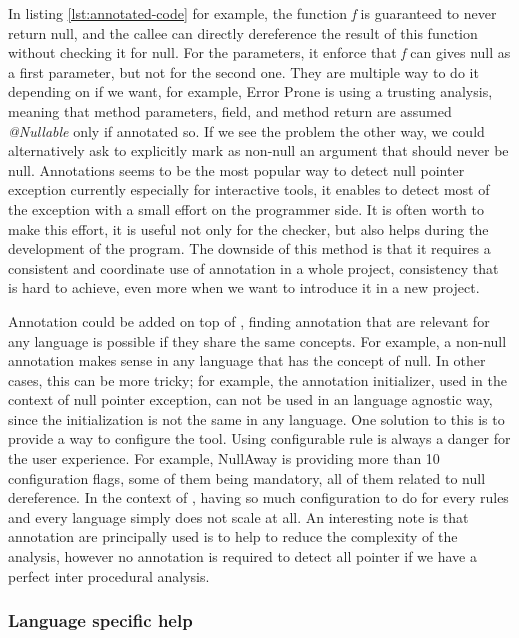 In listing \ref{lst:annotated-code} for example, the function \emph{f} is guaranteed to never return null, and the callee can directly dereference the result of this function without checking it for null. 
For the parameters, it enforce that \emph{f} can gives null as a first parameter, but not for the second one.\newline
They are multiple way to do it depending on if we want, for example, Error Prone is using a trusting analysis, meaning that method parameters, field, and method return are assumed \emph{@Nullable} only if annotated so. 
If we see the problem the other way, we could alternatively ask to explicitly mark as non-null an argument that should never be null.\newline
Annotations seems to be the most popular way to detect null pointer exception currently especially for interactive tools, it enables to detect most of the exception with a small effort on the programmer side. 
It is often worth to make this effort, it is useful not only for the checker, but also helps during the development of the program. 
The downside of this method is that it requires a consistent and coordinate use of annotation in a whole project, consistency that is hard to achieve, even more when we want to introduce it in a new project.

Annotation could be added on top of \slang, finding annotation that are relevant for any language is possible if they share the same concepts. 
For example, a non-null annotation makes sense in any language that has the concept of null. 
In other cases, this can be more tricky; for example, the annotation initializer, used in the context of null pointer exception, can not be used in an language agnostic way, since the initialization is not the same in any language.\newline
One solution to this is to provide a way to configure the tool. 
Using configurable rule is always a danger for the user experience. For example, NullAway is providing more than 10 configuration flags, some of them being mandatory, all of them related to null dereference. 
In the context of \slang, having so much configuration to do for every rules and every language simply does not scale at all.\newline
An interesting note is that annotation are principally used is to help to reduce the complexity of the analysis, however no annotation is required to detect all pointer if we have a perfect inter procedural analysis.


\subsubsection{Language specific help}
\label{subsubsec:language_specific_help}


